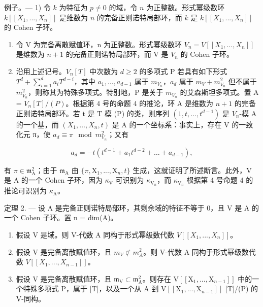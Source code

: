 例子。--- 1) 令 \(k\) 为特征为 \(p \neq 0\) 的域，令 \(n\) 为正整数。形式幂级数环 \(k[[X_1, ..., X_n]]\) 是维数为 \(n\) 的完备正则诺特局部环，而 \(k\) 是 \(k[[X_1, ..., X_n]]\) 的 Cohen 子环。

\begin{enumerate}
\def\labelenumi{\arabic{enumi})}
\setcounter{enumi}{1}
\item
  令 V 为完备离散赋值环，n 为正整数。形式幂级数环 \(V_{n} = V[[X_{1}, ..., X_{n}]]\) 是维数为 \(n + 1\) 的完备正则诺特局部环，而 V 是 \(V_{n}\) 的 Cohen 子环。
\item
  沿用上述记号。\(V_{n}[T]\) 中次数为 \(d \geqslant 2\) 的多项式 P 若具有如下形式 \(T^{d} + \sum_{i=1}^{d} a_{i} T^{d-i}\)，其中 \(a_{1}, \ldots, a_{d-1}\) 属于 \(m_{V_{n}}\)，\(a_{d}\) 属于 \(m_{V} + m_{V_{n}}^{2}\) 但不属于 \(m_{V_{n}}^{2}\)，则称其为特殊多项式。特别地，P 是关于 \(m_{V_{n}}\) 的艾森斯坦多项式。置 A = \(V_{n}[T]/(P)\)。根据第 4 号的命题 4 的推论，环 A 是维数为 \(n + 1\) 的完备正则诺特局部环。若 t 是 T 模 (P) 的类，则序列 \((1, t, \ldots, t^{d-1})\) 是 \(V_{n}\)-模 A 的一个基，而 \((X_{1}, \ldots, X_{n}, t)\) 是 A 的一个坐标系：事实上，存在 V 的一致化元 π，使 \(a_{d} \equiv \pi \mod m_{V_{n}}^{2}\)；又有
\end{enumerate}

\[
a _ {d} = - t \left(t ^ {d - 1} + a _ {1} t ^ {d - 2} + \dots + a _ {d - 1}\right),
\]

有 \(\pi\in\mathfrak{m}_{\mathrm{A}}^{2}\)；由于 \(\mathfrak{m}_{\mathrm{A}}\) 由 \(\{\pi,\mathrm{X}_{1},..., \mathrm{X}_{n},t\}\) 生成，这就证明了所述断言。此外，V 是 A 的一个 Cohen 子环，因为 \(\kappa_{\mathrm{V}}\) 可识别为 \(\kappa_{\mathrm{V}_{n}}\)，而 \(\kappa_{\mathrm{V}_{n}}\) 根据第 4 号命题 4 的推论可识别为 \(\kappa_{\mathrm{A}}\)。

定理 2. --- 设 A 是完备正则诺特局部环，其剩余域的特征不等于 0，且 V 是 A 的一个 Cohen 子环。置 n = dim(A)。

\begin{enumerate}
\def\labelenumi{\alph{enumi})}
\item
  假设 V 是域。则 V-代数 A 同构于形式幂级数代数 \(V[[X_{1}, ..., X_{n}]]\)。
\item
  假设 V 是完备离散赋值环，且 \(m_{V} \not\subset m_{A}^{2}\)。则 V-代数 A 同构于形式幂级数代数 \(V[[X_{1}, ..., X_{n-1}]]\)。
\item
  假设 V 是完备离散赋值环，且 \(\mathfrak{m}_{\mathrm{V}} \subset \mathfrak{m}_{\mathrm{A}}^{2}\)。则存在 \(\mathrm{V}[[\mathrm{X}_{1}, ..., \mathrm{X}_{n-1}]]\) 中的一个特殊多项式 P，属于 {[}T{]}，以及一个从 A 到 \(\mathrm{V}[[\mathrm{X}_{1}, ..., \mathrm{X}_{n-1}]]\) {[}T{]}/(P) 的 V-同构。
\end{enumerate}

